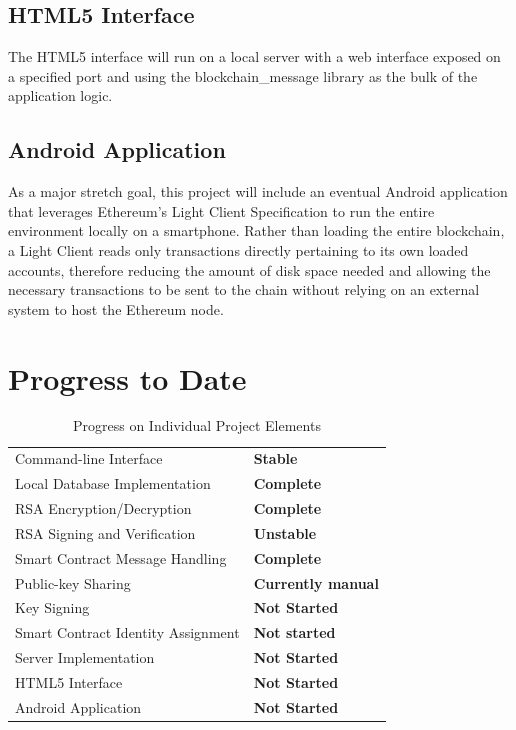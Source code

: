 \documentclass[titlepage]{report}
\begin{document}
\subsection{HTML5 Interface}
The HTML5 interface will run on a local server with a web interface exposed on a specified port and using the blockchain\_message library as the bulk of the application logic.

\subsection{Android Application}
As a major stretch goal, this project will include an eventual Android application that leverages Ethereum's Light Client Specification to run the entire environment locally on a smartphone. Rather than loading the entire blockchain, a Light Client reads only transactions directly pertaining to its own loaded accounts, therefore reducing the amount of disk space needed and allowing the necessary transactions to be sent to the chain without relying on an external system to host the Ethereum node.

\pagebreak

\section{Progress to Date}

\begin{table}[ht]
\begin{center}
\caption{Progress on Individual Project Elements}
\begin{tabular}{ | l | p{5cm} |}
\hline
Command-line Interface & \textbf{Stable} \\
Local Database Implementation & \textbf{Complete} \\
RSA Encryption/Decryption & \textbf{Complete} \\
RSA Signing and Verification & \textbf{Unstable} \\
Smart Contract Message Handling & \textbf{Complete} \\
\hline
Public-key Sharing & \textbf{Currently manual} \\
Key Signing & \textbf{Not Started} \\
\hline
Smart Contract Identity Assignment & \textbf{Not started} \\
Server Implementation & \textbf{Not Started} \\
HTML5 Interface & \textbf{Not Started} \\
Android Application & \textbf{Not Started} \\
\hline
\end{tabular}
\end{center}
\end{table}

\listoftables
\listoffigures
\printindex
\printglossaries{}
\printbibliography{}
\end{document}

